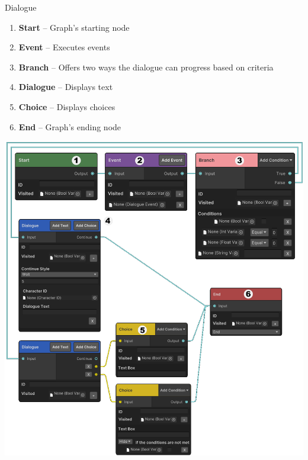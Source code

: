 \documentclass[portrait,a0paper,fontscale=0.35]{baposter}
\begin{document}
\begin{poster}
\begin{posterbox}[column=1, span=1, name=ds, below=is, %
]{Dialogue}
\begin{multicols}{2}
\begin{enumerate}
\setlength
\itemsep{0.0em}
    \item \textbf{Start} -- Graph's starting node
    \item \textbf{Event} -- Executes events
    \item \textbf{Branch} -- Offers two ways the dialogue can progress based on criteria
    \item \textbf{Dialogue} -- Displays text
    \item \textbf{Choice} -- Displays choices
    \item \textbf{End} -- Graph's ending node
\end{enumerate}
\end{multicols}

\begin{center}
\includegraphics[width=0.7\linewidth]{img/nodes2.png}
\end{center}

\end{posterbox}



\end{poster}
\end{document}

